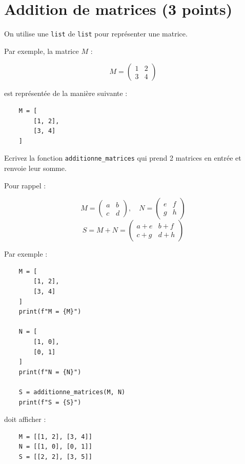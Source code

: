 \documentclass{exam}
\begin{document}
\section{Addition de matrices \small{(3 points)}}
\begin{questions}
    \question On utilise une \texttt{list} de \texttt{list} pour représenter une matrice.

    Par exemple, la matrice $M$ :

    $$
    M =
    \begin{pmatrix}
        1 & 2 \\
        3 & 4
    \end{pmatrix}
    $$

    est représentée de la manière suivante :

    \begin{verbatim}
    M = [
        [1, 2],
        [3, 4]
    ]
    \end{verbatim}

    Ecrivez la fonction \texttt{additionne\_matrices} qui prend 2 matrices en entrée et renvoie leur somme.

    Pour rappel :

    $$
    M =
    \begin{pmatrix}
        a & b \\
        c & d
    \end{pmatrix}
    ,\quad
    N =
    \begin{pmatrix}
        e & f \\
        g & h
    \end{pmatrix}
    $$
    $$
    S = M + N =
    \begin{pmatrix}
        a + e & b + f \\
        c + g & d + h
    \end{pmatrix}
    $$

    Par exemple :
    \begin{verbatim}
    M = [
        [1, 2],
        [3, 4]
    ]
    print(f"M = {M}")

    N = [
        [1, 0],
        [0, 1]
    ]
    print(f"N = {N}")

    S = additionne_matrices(M, N)
    print(f"S = {S}")
    \end{verbatim}

    doit afficher :
    \begin{verbatim}
    M = [[1, 2], [3, 4]]
    N = [[1, 0], [0, 1]]
    S = [[2, 2], [3, 5]]
    \end{verbatim}   
    \vspace*{5cm}
\end{questions}
\end{document}
